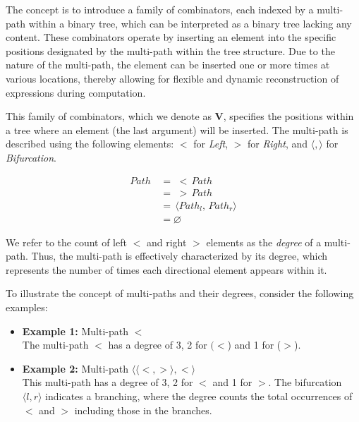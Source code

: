 \documentclass{IEEEtran}
\begin{document}
\par The concept is to introduce a family of combinators, each indexed by a multi-path within a binary tree, which can be interpreted as a binary tree lacking any content. These combinators operate by inserting an element into the specific positions designated by the multi-path within the tree structure. Due to the nature of the multi-path, the element can be inserted one or more times at various locations, thereby allowing for flexible and dynamic reconstruction of expressions during computation.

\par This family of combinators, which we denote as \textbf{V}, specifies the positions within a tree where an element (the last argument) will be inserted. The multi-path is described using the following elements: \(<\) for \textit{Left}, \(>\) for \textit{Right}, and \(\langle , \rangle\) for \textit{Bifurcation}.


\begin{align*}
Path \,&= \, \, < \, Path \\
    &= \, \, > \, Path \\
    &= \, \langle Path_l,\, Path_r \rangle \\
    &= \varnothing
\end{align*}


\par We refer to the count of left \(<\) and right \(>\) elements as the \textit{degree} of a multi-path. Thus, the multi-path is effectively characterized by its degree, which represents the number of times each directional element appears within it.

\par To illustrate the concept of multi-paths and their degrees, consider the following examples:

\begin{itemize}
    \item \textbf{Example 1:} Multi-path \(< > <\) \\
    The multi-path \(< > <\) has a degree of 3, 2 for \((<\)) and 1 for (\(>\)).

    \item \textbf{Example 2:} Multi-path \(\langle \langle < , > \rangle ,  < \rangle\) \\
    This multi-path has a degree of 3, 2 for \(<\) and 1 for \(>\). The bifurcation \(\langle l, r \rangle\) indicates a branching, where the degree counts the total occurrences of \(<\) and \(>\) including those in the branches.
\end{itemize}
\end{document}
